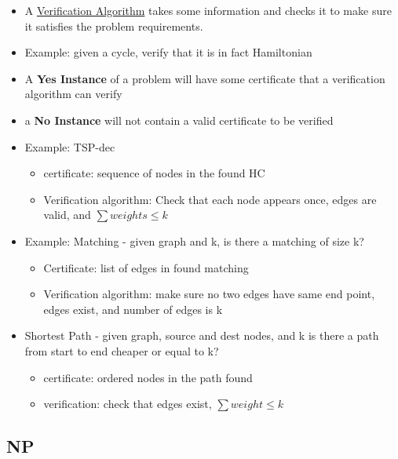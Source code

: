 \documentclass[12pt, letter]{article}
\begin{document}
\begin{itemize}
	\item A \underline{Verification Algorithm} takes some information and checks it to make sure it satisfies the problem requirements.
	\item Example: given a cycle, verify that it is in fact Hamiltonian
	\item A \textbf{Yes Instance} of a problem will have some certificate that a verification algorithm can verify
	\item a  \textbf{No Instance} will not contain a valid certificate to be verified
	\item Example: TSP-dec
	\begin{itemize}
		\item certificate: sequence of nodes in the found HC
		\item Verification algorithm: Check that each node appears once, edges are valid, and $\sum weights \le k$
	\end{itemize}
	\item Example: Matching - given graph and k, is there a matching of size k?
	\begin{itemize}
		\item Certificate: list of edges in found matching
		\item Verification algorithm: make sure no two edges have same end point, edges exist, and number of edges is k
	\end{itemize}
	\item Shortest Path - given graph, source and dest nodes, and k is there a path from start to end cheaper or equal to k?
	\begin{itemize}
		\item certificate: ordered nodes in the path found
		\item verification: check that edges exist, $\sum weight \le k$
	\end{itemize}
\end{itemize}

\subsection*{NP}
\end{document}

